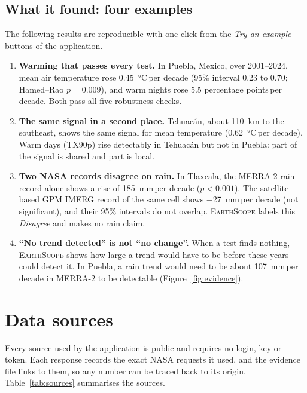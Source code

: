 \documentclass[12pt, oneside, openany]{report}
\newcommand{\EarthScope}{\textsc{EarthScope}}
\newcommand{\perdecade}{\,per decade}
\begin{document}
\section{What it found: four examples}

The following results are reproducible with one click from the \emph{Try an example} buttons of the application.

\begin{enumerate}[leftmargin=*]
    \item \textbf{Warming that passes every test.} In Puebla, Mexico, over 2001--2024, mean air temperature rose \SI{+0.45}{\celsius}\perdecade{} (95\% interval \num{+0.23} to \num{+0.70}; Hamed--Rao $p = 0.009$), and warm nights rose 5.5 percentage points\perdecade. Both pass all five robustness checks.
    \item \textbf{The same signal in a second place.} Tehuacán, about \SI{110}{\km} to the southeast, shows the same signal for mean temperature (\SI{+0.62}{\celsius}\perdecade). Warm days (TX90p) rise detectably in Tehuacán but not in Puebla: part of the signal is shared and part is local.
    \item \textbf{Two NASA records disagree on rain.} In Tlaxcala, the MERRA-2 rain record alone shows a rise of \SI{+185}{\mm}\perdecade{} ($p < 0.001$). The satellite-based GPM IMERG record of the same cell shows \SI{-27}{\mm}\perdecade{} (not significant), and their 95\% intervals do not overlap. \EarthScope{} labels this \emph{Disagree} and makes no rain claim.
    \item \textbf{\enquote{No trend detected} is not \enquote{no change}.} When a test finds nothing, \EarthScope{} shows how large a trend would have to be before these years could detect it. In Puebla, a rain trend would need to be about \SI{107}{\mm}\perdecade{} in MERRA-2 to be detectable (Figure~\ref{fig:evidence}).
\end{enumerate}

\chapter{Data sources}\label{cap:data}

Every source used by the application is public and requires no login, key or token. Each response records the exact NASA requests it used, and the evidence file links to them, so any number can be traced back to its origin. Table~\ref{tab:sources} summarises the sources.
\end{document}
